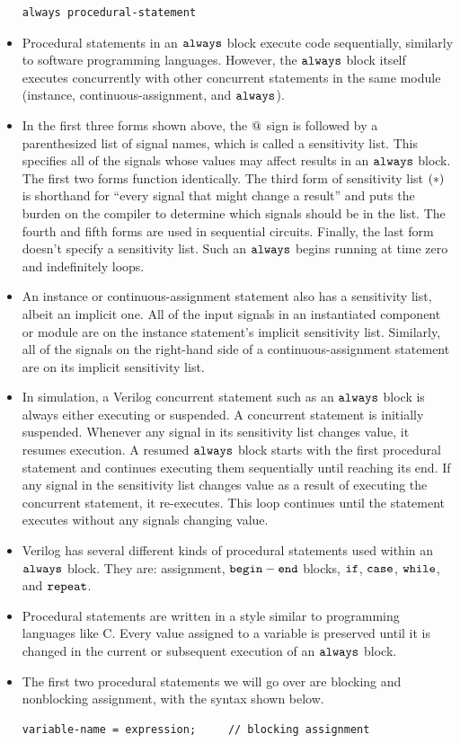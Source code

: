 \documentclass[10pt,a4paper]{article}
\begin{document}
\begin{itemize}
\begin{lstlisting}
always procedural-statement
\end{lstlisting}
\item Procedural statements in an $\tt{always}$ block execute code sequentially, similarly to software programming languages. However, the $\tt{always}$ block itself executes concurrently with other concurrent statements in the same module (instance, continuous-assignment, and $\tt{always}$). 
\item In the first three forms shown above, the $\tt{@}$ sign is followed by a parenthesized list of signal names, which is called a sensitivity list. This specifies all of the signals whose values may affect results in an $\tt{always}$ block. The first two forms function identically. The third form of sensitivity list $\tt{(*)}$ is shorthand for ``every signal that might change a result'' and puts the burden on the compiler to determine which signals should be in the list. The fourth and fifth forms are used in sequential circuits. Finally, the last form doesn't specify a sensitivity list. Such an $\tt{always}$ begins running at time zero and indefinitely loops. 
\item An instance or continuous-assignment statement also has a sensitivity list, albeit an implicit one. All of the input signals in an instantiated component or module are on the instance statement's implicit sensitivity list. Similarly, all of the signals on the right-hand side of a continuous-assignment statement are on its implicit sensitivity list.
\item In simulation, a Verilog concurrent statement such as an $\tt{always}$ block is always either executing or suspended. A concurrent statement is initially suspended. Whenever any signal in its sensitivity list changes value, it resumes execution. A resumed $\tt{always}$ block starts with the first procedural statement and continues executing them sequentially until reaching its end. If any signal in the sensitivity list changes value as a result of executing the concurrent statement, it re-executes. This loop continues until the statement executes without any signals changing value.
\item Verilog has several different kinds of procedural statements used within an $\tt{always}$ block. They are: assignment, $\tt{begin-end}$ blocks, $\tt{if}$, $\tt{case}$, $\tt{while}$, and $\tt{repeat}$. 
\item Procedural statements are written in a style similar to programming languages like C. Every value assigned to a variable is preserved until it is changed in the current or subsequent execution of an $\tt{always}$ block. 
\item The first two procedural statements we will go over are blocking and nonblocking assignment, with the syntax shown below.
\begin{lstlisting}
variable-name = expression;		// blocking assignment


\end{lstlisting}
\end{itemize}
\end{document}
